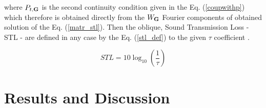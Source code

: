 \documentclass[a4paper]{ICEDyn}
\begin{document}
where $P_{t,{\bf G}}$ is the second continuity condition given in the Eq. (\ref{coupwithp}) which therefore is obtained directly from the $W_{\bf G}$ Fourier components of obtained solution of the Eq. (\ref{matr_stl}). Then the oblique,  Sound Transmission Loss - STL - are defined in any case by the Eq. (\ref{stl_def}) to the given $\tau$ coefficient \cite{Xiao2012s}.
	
	\begin{equation}
	\label{stl_def}
	STL = 10\log_{10}\left(\frac{1}{\tau}\right)
	\end{equation}
    	
	\section{Results and Discussion}
\end{document}
